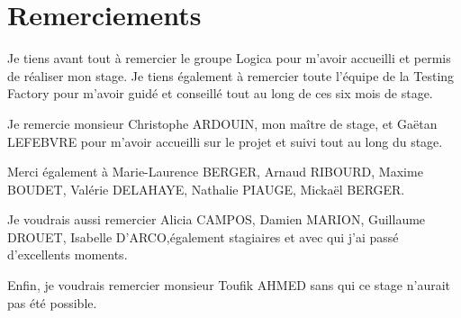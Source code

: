 \chapter*{Remerciements}


Je tiens avant tout à remercier le groupe Logica pour m'avoir accueilli et permis de réaliser mon stage. Je tiens également à remercier toute l'équipe de la Testing Factory pour m'avoir guidé et conseillé tout au long de ces six mois de stage.

Je remercie monsieur Christophe ARDOUIN, mon maître de stage, et Gaëtan LEFEBVRE pour m'avoir accueilli sur le projet et suivi tout au long du stage.

Merci également à Marie-Laurence BERGER, Arnaud RIBOURD, Maxime BOUDET, Valérie DELAHAYE, Nathalie PIAUGE,  Mickaël BERGER.

Je voudrais aussi remercier Alicia CAMPOS, Damien MARION, Guillaume DROUET, Isabelle D'ARCO,également stagiaires et avec qui j'ai passé d'excellents moments.

Enfin, je voudrais remercier monsieur Toufik AHMED sans qui ce stage n'aurait pas été possible.  
 
